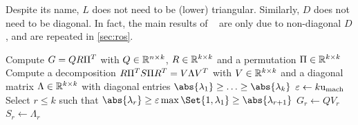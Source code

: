 \begin{remark}
  Despite its name, $L$ does not need to be (lower) triangular.
  Similarly, $D$ does not need to be diagonal.
  In fact, the main results of \citeauthor{Lang2015}~\cite{Lang2015} are only due to non-diagonal $D$,
  and are repeated in \autoref{sec:ros}.
\end{remark}

\begin{algorithm}[t]
  \caption[Column Compression for Low-Rank Symmetric Indefinite Factorizations]{%
    Column Compression for \acp{LRSIF}
  }
  \label{alg:lowrank:compression}
  Compute $G=QR\Pi^T$ with $Q\in\mathbb{R}^{n\times k}$, $R\in\mathbb{R}^{k\times k}$ and a permutation $\Pi\in\mathbb{R}^{k\times k}$\;
  Compute a decomposition $R \Pi^T S \Pi R^T = V \Lambda V^T$ with $V \in \mathbb{R}^{k\times k}$
  and a diagonal matrix $\Lambda\in\mathbb{R}^{k\times k}$ with diagonal entries $\abs{\lambda_1}\geq\ldots\geq\abs{\lambda_k}$\;
  $\varepsilon \gets k \mathrm u_\text{mach}$\;
  Select $r \leq k$ such that $\abs{\lambda_r} \geq \epsilon\max\Set{1, \lambda_1} \geq \abs{\lambda_{r+1}}$\;
  $G_r \gets Q V_r$\;
  $S_r \gets \Lambda_r$\;
\end{algorithm}

